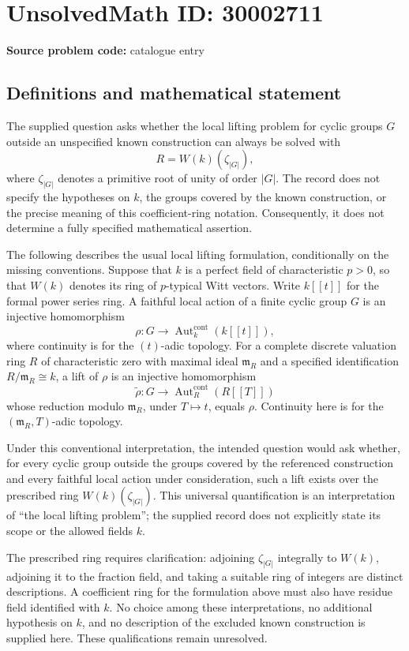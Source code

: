 \documentclass[11pt]{article}
\begin{document}
\section*{UnsolvedMath ID: 30002711}
\textbf{Source problem code:} catalogue entry
\subsection{Definitions and mathematical statement}
The supplied question asks whether the local lifting problem for cyclic groups \(G\) outside an unspecified known construction can always be solved with
\[
R=W(k)(\zeta_{|G|}),
\]
where \(\zeta_{|G|}\) denotes a primitive root of unity of order \(|G|\). The record does not specify the hypotheses on \(k\), the groups covered by the known construction, or the precise meaning of this coefficient-ring notation. Consequently, it does not determine a fully specified mathematical assertion.

The following describes the usual local lifting formulation, conditionally on the missing conventions. Suppose that \(k\) is a perfect field of characteristic \(p>0\), so that \(W(k)\) denotes its ring of \(p\)-typical Witt vectors. Write \(k[[t]]\) for the formal power series ring. A faithful local action of a finite cyclic group \(G\) is an injective homomorphism
\[
\rho:G\longrightarrow\operatorname{Aut}^{\mathrm{cont}}_k(k[[t]]),
\]
where continuity is for the \((t)\)-adic topology. For a complete discrete valuation ring \(R\) of characteristic zero with maximal ideal \(\mathfrak m_R\) and a specified identification \(R/\mathfrak m_R\cong k\), a lift of \(\rho\) is an injective homomorphism
\[
\widetilde\rho:G\longrightarrow\operatorname{Aut}^{\mathrm{cont}}_R(R[[T]])
\]
whose reduction modulo \(\mathfrak m_R\), under \(T\mapsto t\), equals \(\rho\). Continuity here is for the \((\mathfrak m_R,T)\)-adic topology.

Under this conventional interpretation, the intended question would ask whether, for every cyclic group outside the groups covered by the referenced construction and every faithful local action under consideration, such a lift exists over the prescribed ring \(W(k)(\zeta_{|G|})\). This universal quantification is an interpretation of ``the local lifting problem''; the supplied record does not explicitly state its scope or the allowed fields \(k\).

The prescribed ring requires clarification: adjoining \(\zeta_{|G|}\) integrally to \(W(k)\), adjoining it to the fraction field, and taking a suitable ring of integers are distinct descriptions. A coefficient ring for the formulation above must also have residue field identified with \(k\). No choice among these interpretations, no additional hypothesis on \(k\), and no description of the excluded known construction is supplied here. These qualifications remain unresolved.
\end{document}
